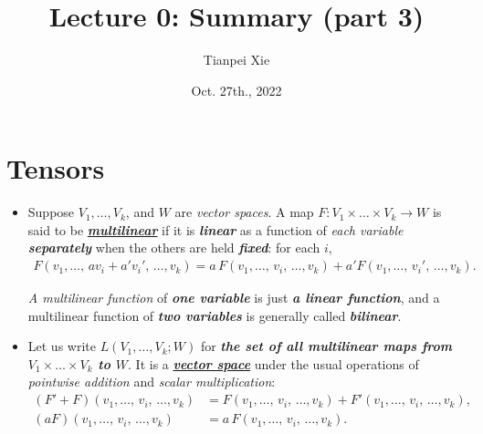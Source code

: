 \documentclass[11pt]{article}
\begin{document}
\title{Lecture 0: Summary (part 3)}
\author{ Tianpei Xie}
\date{Oct. 27th., 2022}
\maketitle
\tableofcontents
\newpage
\section{Tensors}
\begin{itemize}
\item 
\begin{definition}
Suppose $V_1,\ldots,V_k$, and $W$ are \emph{vector spaces}. A map $F: V_1\times \ldots \times V_k \rightarrow W$ is said to be \underline{\emph{\textbf{multilinear}}} if it is \emph{\textbf{linear}} as a function of \emph{each variable \textbf{separately}} when the others are held \emph{\textbf{fixed}}: for each $i$,
\begin{align*}
F(v_1,\ldots,\,av_i + a'v_i',\, \ldots, v_k) = a\,F(v_1,\ldots,\,v_i,\, \ldots, v_k)  + a'F(v_1,\ldots,\, v_i',\, \ldots, v_k).
\end{align*} 

\emph{A multilinear function} of \emph{\textbf{one variable}} is just \emph{\textbf{a linear function}}, and a multilinear
function of \emph{\textbf{two variables}} is generally called \emph{\textbf{bilinear}}.
\end{definition}

\item \begin{remark}
Let us write $L(V_1,\ldots,V_k ; W)$ for \emph{\textbf{the set of all multilinear maps from $V_1\times \ldots \times V_k$ to $W$}}. It is a \underline{\emph{\textbf{vector space}}} under the usual operations of \emph{pointwise addition} and \emph{scalar multiplication}:
\begin{align*}
(F'+F)(v_1,\ldots,\,v_i,\, \ldots, v_k) &= F(v_1,\ldots,\,v_i,\, \ldots, v_k)  +  F'(v_1,\ldots,\,v_i,\, \ldots, v_k),\\
(aF)(v_1,\ldots,\,v_i,\, \ldots, v_k)  &= a\,F(v_1,\ldots,\,v_i,\, \ldots, v_k).
\end{align*}
\end{remark}


\end{itemize}
\end{document}
